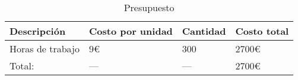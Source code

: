 \chapter{\ChapterFive{}}
\lhead{\emph{\ChapterFive{}}}


\begin{table}[!ht]
\centering
\caption{Presupuesto}
\label{tabla-presupuesto}
\begin{tabular}{|l|l|l|l|}
\hline
Descripción      & Costo por unidad & Cantidad & Costo total \\ \hline
Horas de trabajo & 9\euro{}         & 300      & 2700\euro{} \\ \hline
Total:           & ---              & ---      & 2700\euro{} \\ \hline
\end{tabular}
\end{table}